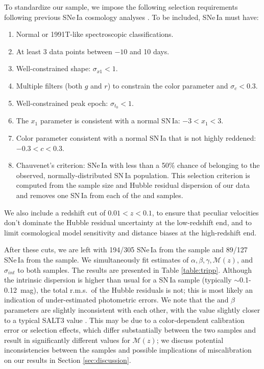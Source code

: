 \documentclass[twocolumn,twocolappendix, linenumbers]{aastex631} %
\begin{document}
To standardize our sample, we impose the following selection requirements following previous SNe\,Ia cosmology analyses \citep[e.g.,][]{Brout22}.  To be included, SNe\,Ia must have:
\begin{enumerate}
    \item Normal or 1991T-like spectroscopic classifications.
    \item At least 3 data points between $-10$ and 10 days.
    \item Well-constrained shape: $\sigma_{x1} < 1$.
    \item Multiple filters (both $g$ and $r$) to constrain the color parameter and $\sigma_c < 0.3$.
    \item Well-constrained peak epoch: $\sigma_{t_0} < 1$.
    \item The $x_1$ parameter is consistent with a normal SN\,Ia: $-3 < x_1 < 3$.
    \item Color parameter consistent with a normal SN\,Ia that is not highly reddened: $-0.3 < c < 0.3$.
    \item Chauvenet's criterion: SNe\,Ia with less than a 50\% chance of belonging to the observed, normally-distributed SN\,Ia population.  This selection criterion is computed from the sample size and Hubble residual dispersion of our data and removes one SN\,Ia from each of the \citet{Yao19} and \citet{Dhawan22}  samples.
\end{enumerate} %
\noindent We also include a redshift cut of $0.01 < z < 0.1$, to ensure that peculiar velocities don't dominate the Hubble residual uncertainty at the low-redshift end, and to limit cosmological model sensitivity and distance biases at the high-redshift end.  

After these cuts, we are left with 194/305 SNe\,Ia from the \citet{Dhawan22} sample and 89/127 SNe\,Ia from the \citet{Yao19} sample. 
We simultaneously fit estimates of $\alpha, \beta, \gamma, \mathcal{M}(z)$, and $\sigma_{int}$ to both samples.  The results are presented in Table \ref{table:tripp}.  Although the intrinsic dispersion is higher than usual for a SN\,Ia sample (typically $\sim$0.1-0.12~mag), the total r.m.s.\ of the Hubble residuals is not; this is most likely an indication of under-estimated photometric errors.  We note that the \citet{Yao19} and \citet{Dhawan22} $\beta$ parameters are slightly inconsistent with each other, with the \citet{Yao19} value slightly closer to a typical SALT3 value \citep{Kenworthy21}.
This may be due to a color-dependent calibration error or selection effects, which differ substantially between the two samples and result in significantly different values for $\mathcal{M}(z)$; we discuss potential inconsistencies between the samples and possible implications of miscalibration on our results in Section \ref{sec:discussion}.
\end{document}
